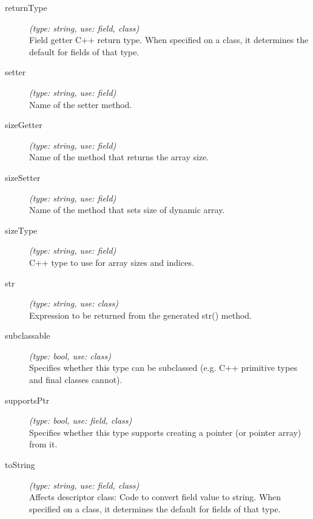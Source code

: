 \begin{description}
\item[returnType] \textit{(type: string, use: field, class)} \\
    Field getter C++ return type. When specified on a class, it determines the
    default for fields of that type.

\item[setter] \textit{(type: string, use: field)} \\
    Name of the setter method.

\item[sizeGetter] \textit{(type: string, use: field)} \\
    Name of the method that returns the array size.

\item[sizeSetter] \textit{(type: string, use: field)} \\
    Name of the method that sets size of dynamic array.

\item[sizeType] \textit{(type: string, use: field)} \\
    C++ type to use for array sizes and indices.

\item[str] \textit{(type: string, use: class)} \\
    Expression to be returned from the generated str() method.

\item[subclassable] \textit{(type: bool, use: class)} \\
    Specifies whether this type can be subclassed (e.g. C++ primitive types and
    final classes cannot).

\item[supportsPtr] \textit{(type: bool, use: field, class)} \\
    Specifies whether this type supports creating a pointer (or pointer array)
    from it.

\item[toString] \textit{(type: string, use: field, class)} \\
    Affects descriptor class: Code to convert field value to string. When
    specified on a class, it determines the default for fields of that type.

\end{description}

